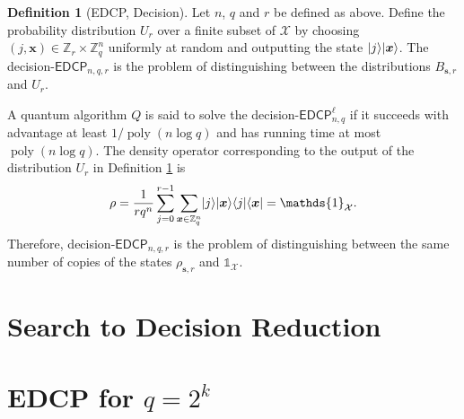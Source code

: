 \documentclass[11pt]{article}
\theoremstyle{plain}
\theoremstyle{definition}
\newtheorem{definition}[theorem]{Definition}
\DeclareMathOperator{\poly}{poly}
\DeclarePairedDelimiter{\ldbrac}{\lvert}{\rangle}
\DeclarePairedDelimiter{\rdbrac}{\langle}{\rvert}
\def\Z{\ensuremath{\mathbb{Z}}}
\def\edcp{\ensuremath{\mathsf{EDCP}}}
\begin{document}
\begin{definition}[EDCP, Decision]
    \label{def:d-edcp}
    Let $n$, $q$ and $r$ be defined as above. Define the probability distribution $U_{r}$ over a finite subset of $\mathcal{X}$ by choosing $(j, \bm{x}) \in \Z_r \times \Z_q^n$ uniformly at random and outputting the state $\ldbrac{j}\ldbrac{\bm{x}}$. The decision-$\edcp_{n, q, r}$ is the problem of distinguishing between the distributions $B_{\bm{s}, r}$ and $U_r$.
\end{definition}
A quantum algorithm $Q$ is said to solve the decision-$\edcp_{n, q}^\ell$ if it succeeds with advantage at least $1 / \poly(n\log q)$ and has running time at most $\poly(n\log q)$. The density operator corresponding to the output of the distribution $U_r$ in Definition \ref{def:d-edcp} is
\[ \rho = \frac{1}{rq^n} \sum_{j = 0}^{r - 1} \sum_{\bm{x} \in \Z_q^n}  \ldbrac{j}\ldbrac{\bm{x}} \rdbrac{j}\rdbrac{\bm{x}} = \mathds{1}_{\mathcal{X}}. \]
Therefore, decision-$\edcp_{n, q, r}$ is the problem of distinguishing between the same number of copies of the states $\rho_{\bm{s}, r}$ and $\mathds{1}_{\mathcal{X}}$. 





\section{Search to Decision Reduction}








\section{EDCP for \boldmath${q = 2^k}$\unboldmath}
\end{document}
